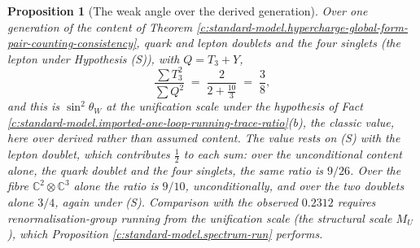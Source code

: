 \documentclass[11pt]{article}
\newtheorem{proposition}[theorem]{Proposition}
\theoremstyle{definition}
\theoremstyle{plain}
\newcommand{\changedmark}[2]{\marginpar{\raggedright\scriptsize\color{#1}#2}}
\providecommand{\C}{}\renewcommand{\C}{\mathbb{C}}
\begin{document}
\begin{proposition}[The weak angle over the derived generation]\label{c:standard-model.weak-angle-over-derived-generation}
\changedmark{gray}{reworded}
Over one generation of the content of Theorem \ref{c:standard-model.hypercharge-global-form-pair-counting-consistency}, quark and lepton doublets and the four singlets (the lepton under Hypothesis (S)), with $Q = T_{3} + Y$,
\begin{equation}
\frac{\sum T_{3}^{2}}{\sum Q^{2}} \;=\; \frac{2}{2 + \tfrac{10}{3}} \;=\; \frac{3}{8},
\end{equation}
and this is $\sin^{2}\theta_{W}$ at the unification scale under the hypothesis of Fact \ref{c:standard-model.imported-one-loop-running-trace-ratio}(b), the classic value, here over derived rather than assumed content. The value rests on (S) with the lepton doublet, which contributes $\tfrac12$ to each sum: over the unconditional content alone, the quark doublet and the four singlets, the same ratio is $9/26$. Over the fibre $\C^{2} \otimes \C^{3}$ alone the ratio is $9/10$, unconditionally, and over the two doublets alone $3/4$, again under (S). Comparison with the observed $0.2312$ requires renormalisation-group running from the unification scale (the structural scale $M_{U}$), which Proposition \ref{c:standard-model.spectrum-run} performs.
\end{proposition}
\end{document}
